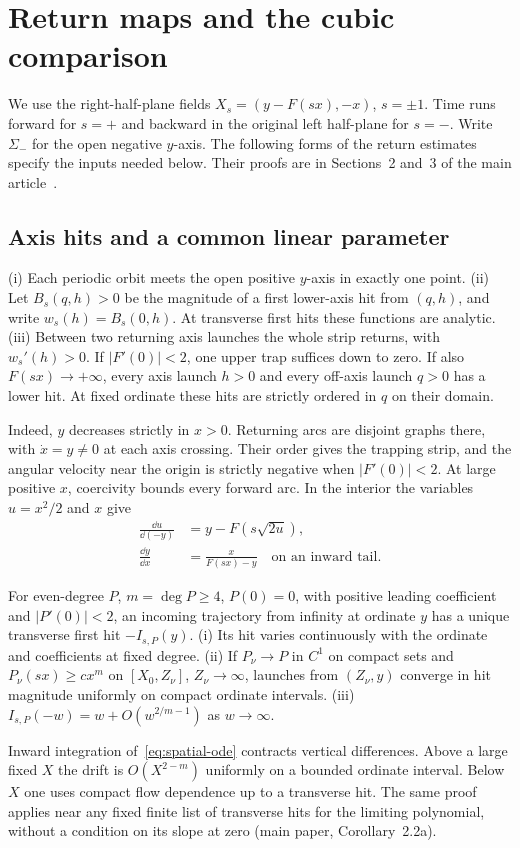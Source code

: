 \section{Return maps and the cubic comparison}\label{sec:foundations}
We use the right-half-plane fields $X_s=(y-F(sx),-x)$, $s=\pm1$.
Time runs forward for $s=+$ and backward in the original left half-plane
for $s=-$. Write $\Sigma_-$ for the open negative $y$-axis. The following forms of the return estimates specify the
inputs needed below. Their proofs are in Sections~2 and~3 of the main article~\cite{MainArticle}.

\subsection{Axis hits and a common linear parameter}
\begin{lemma}\label{lem:half-returns}
(i) Each periodic orbit meets the open positive $y$-axis in exactly one point.
(ii) Let $B_s(q,h)>0$ be the magnitude of a first lower-axis hit from $(q,h)$,
and write $w_s(h)=B_s(0,h)$. At transverse first hits these functions
are analytic. (iii) Between two returning axis launches the whole strip
returns, with $w_s'(h)>0$. If $|F'(0)|<2$, one upper trap suffices down
to zero. If also $F(sx)\to+\infty$, every axis launch $h>0$ and every
off-axis launch $q>0$ has a lower hit. At fixed ordinate these hits are
strictly ordered in $q$ on their domain.
\end{lemma}
Indeed, $y$ decreases strictly in $x>0$. Returning arcs are disjoint
graphs there, with $\dot x=y\ne0$ at each axis crossing. Their order
gives the trapping strip, and the angular velocity near the origin is
strictly negative when $|F'(0)|<2$. At large positive $x$, coercivity
bounds every forward arc. In the interior the variables $u=x^2/2$ and
$x$ give
\begin{align}
 \frac{\dd u}{\dd(-y)}&=y-F(s\sqrt{2u}),\label{eq:scalar-u}\\
 \frac{\dd y}{\dd x}&=\frac{x}{F(sx)-y}\quad\text{on an inward tail}.\label{eq:spatial-ode}
\end{align}

\begin{lemma}\label{lem:incoming-rays}
For even-degree $P$, $m=\deg P\ge4$, $P(0)=0$, with positive leading
coefficient and $|P'(0)|<2$, an incoming trajectory from infinity at
ordinate $y$ has a unique transverse first hit $-I_{s,P}(y)$.
(i) Its hit varies continuously with the ordinate and coefficients at
fixed degree. (ii) If $P_\nu\to P$ in $C^1$ on compact sets and
$P_\nu(sx)\ge c x^m$ on $[X_0,Z_\nu]$, $Z_\nu\to\infty$, launches
from $(Z_\nu,y)$ converge in hit magnitude uniformly on compact ordinate
intervals. (iii) $I_{s,P}(-w)=w+O(w^{2/m-1})$ as $w\to\infty$.
\end{lemma}
Inward integration of~\eqref{eq:spatial-ode} contracts vertical
differences. Above a large fixed $X$ the drift is $O(X^{2-m})$
uniformly on a bounded ordinate interval. Below $X$ one uses compact
flow dependence up to a transverse hit. The same proof applies near
any fixed finite list of transverse hits for the limiting polynomial,
without a condition on its slope at zero (main paper, Corollary~2.2a).

